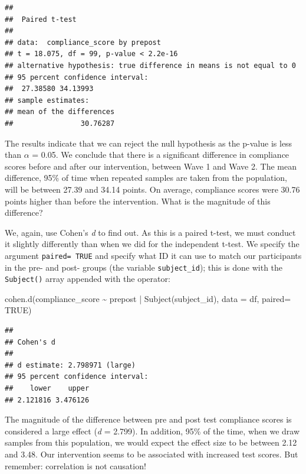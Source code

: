 \documentclass[
]{book}
\newenvironment{Shaded}{\begin{snugshade}}{\end{snugshade}}
\newcommand{\AttributeTok}[1]{\textcolor[rgb]{0.77,0.63,0.00}{#1}}
\newcommand{\ConstantTok}[1]{\textcolor[rgb]{0.00,0.00,0.00}{#1}}
\newcommand{\FunctionTok}[1]{\textcolor[rgb]{0.00,0.00,0.00}{#1}}
\newcommand{\NormalTok}[1]{#1}
\newcommand{\SpecialCharTok}[1]{\textcolor[rgb]{0.00,0.00,0.00}{#1}}
\begin{document}
\begin{verbatim}
## 
##  Paired t-test
## 
## data:  compliance_score by prepost
## t = 18.075, df = 99, p-value < 2.2e-16
## alternative hypothesis: true difference in means is not equal to 0
## 95 percent confidence interval:
##  27.38580 34.13993
## sample estimates:
## mean of the differences 
##                30.76287
\end{verbatim}

The results indicate that we can reject the null hypothesis as the p-value is less than \(\alpha\) = 0.05. We conclude that there is a significant difference in compliance scores before and after our intervention, between Wave 1 and Wave 2. The mean difference, 95\% of time when repeated samples are taken from the population, will be between 27.39 and 34.14 points. On average, compliance scores were 30.76 points higher than before the intervention. What is the magnitude of this difference?

We, again, use Cohen's \emph{d} to find out. As this is a paired t-test, we must conduct it slightly differently than when we did for the independent t-test. We specify the argument \texttt{paired=\ TRUE} and specify what ID it can use to match our participants in the pre- and post- groups (the variable \texttt{subject\_id}); this is done with the \texttt{Subject()} array appended with the \texttt{\textbar{}} operator:

\begin{Shaded}
\begin{Highlighting}[]
\FunctionTok{cohen.d}\NormalTok{(compliance\_score }\SpecialCharTok{\textasciitilde{}}\NormalTok{ prepost }\SpecialCharTok{|} \FunctionTok{Subject}\NormalTok{(subject\_id), }\AttributeTok{data =}\NormalTok{ df, }\AttributeTok{paired=} \ConstantTok{TRUE}\NormalTok{)}
\end{Highlighting}
\end{Shaded}

\begin{verbatim}
## 
## Cohen's d
## 
## d estimate: 2.798971 (large)
## 95 percent confidence interval:
##    lower    upper 
## 2.121816 3.476126
\end{verbatim}

The magnitude of the difference between pre and post test compliance scores is considered a large effect (\emph{d} = 2.799). In addition, 95\% of the time, when we draw samples from this population, we would expect the effect size to be between 2.12 and 3.48. Our intervention seems to be associated with increased test scores. But remember: correlation is not causation!
\end{document}
